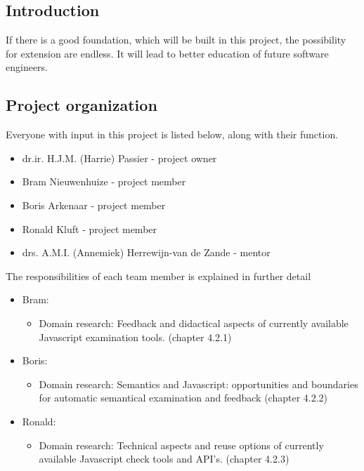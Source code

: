 \documentclass{article}
\begin{document}
\subsection{Introduction}

If there is a good foundation, which will be built in this project, the
possibility for extension are endless. It will lead to better education of
future software engineers.

\subsection{Project organization}
Everyone with input in this project is listed below, along with their function.
\begin{itemize}
  \item dr.ir. H.J.M. (Harrie) Passier - project owner
  \item Bram Nieuwenhuize - project member
  \item Boris Arkenaar - project member
  \item Ronald Kluft - project member
  \item drs. A.M.I. (Annemiek) Herrewijn-van de Zande - mentor
\end{itemize}
The responsibilities of each team member is explained in further detail
\begin{itemize}
  \item Bram: 
    \begin{itemize}
      \item Domain research: Feedback and didactical aspects of currently available Javascript examination tools. (chapter 4.2.1)
    \end{itemize}
  \item Boris:
    \begin{itemize}
      \item Domain research: Semantics and Javascript: opportunities and boundaries for automatic semantical examination and feedback (chapter 4.2.2)
    \end{itemize}
  \item Ronald:
    \begin{itemize}
      \item Domain research: Technical aspects and reuse options of currently available Javascript check tools and API's. (chapter 4.2.3)
    \end{itemize}
\end{itemize}
\end{document}
